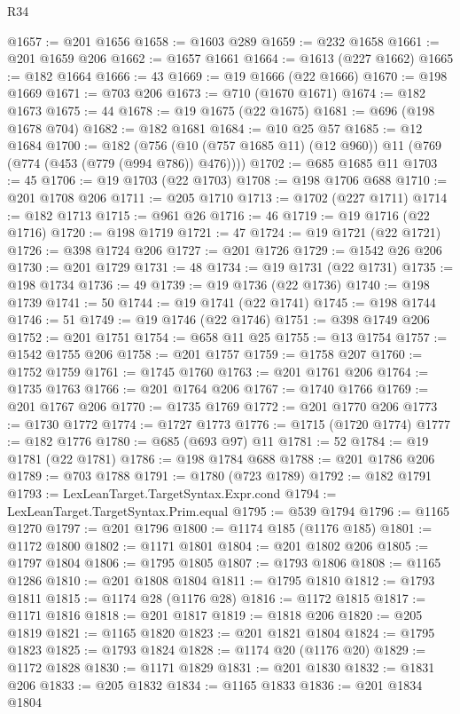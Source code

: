 \begin{lexlean}{R34}
\begin{coremodule}
@1657 := @201 @1656
@1658 := @1603 @289
@1659 := @232 @1658
@1661 := @201 @1659 @206
@1662 := @1657 @1661
@1664 := @1613 (@227 @1662)
@1665 := @182 @1664
@1666 := 43
@1669 := @19 @1666 (@22 @1666)
@1670 := @198 @1669
@1671 := @703 @206
@1673 := @710 (@1670 @1671)
@1674 := @182 @1673
@1675 := 44
@1678 := @19 @1675 (@22 @1675)
@1681 := @696 (@198 @1678 @704)
@1682 := @182 @1681
@1684 := @10 @25 @57
@1685 := @12 @1684
@1700 := @182
    (@756 (@10 (@757 @1685 @11) (@12 @960)) @11 (@769 (@774 (@453 (@779 (@994 @786)) @476))))
@1702 := @685 @1685 @11
@1703 := 45
@1706 := @19 @1703 (@22 @1703)
@1708 := @198 @1706 @688
@1710 := @201 @1708 @206
@1711 := @205 @1710
@1713 := @1702 (@227 @1711)
@1714 := @182 @1713
@1715 := @961 @26
@1716 := 46
@1719 := @19 @1716 (@22 @1716)
@1720 := @198 @1719
@1721 := 47
@1724 := @19 @1721 (@22 @1721)
@1726 := @398 @1724 @206
@1727 := @201 @1726
@1729 := @1542 @26 @206
@1730 := @201 @1729
@1731 := 48
@1734 := @19 @1731 (@22 @1731)
@1735 := @198 @1734
@1736 := 49
@1739 := @19 @1736 (@22 @1736)
@1740 := @198 @1739
@1741 := 50
@1744 := @19 @1741 (@22 @1741)
@1745 := @198 @1744
@1746 := 51
@1749 := @19 @1746 (@22 @1746)
@1751 := @398 @1749 @206
@1752 := @201 @1751
@1754 := @658 @11 @25
@1755 := @13 @1754
@1757 := @1542 @1755 @206
@1758 := @201 @1757
@1759 := @1758 @207
@1760 := @1752 @1759
@1761 := @1745 @1760
@1763 := @201 @1761 @206
@1764 := @1735 @1763
@1766 := @201 @1764 @206
@1767 := @1740 @1766
@1769 := @201 @1767 @206
@1770 := @1735 @1769
@1772 := @201 @1770 @206
@1773 := @1730 @1772
@1774 := @1727 @1773
@1776 := @1715 (@1720 @1774)
@1777 := @182 @1776
@1780 := @685 (@693 @97) @11
@1781 := 52
@1784 := @19 @1781 (@22 @1781)
@1786 := @198 @1784 @688
@1788 := @201 @1786 @206
@1789 := @703 @1788
@1791 := @1780 (@723 @1789)
@1792 := @182 @1791
@1793 := LexLeanTarget.TargetSyntax.Expr.cond
@1794 := LexLeanTarget.TargetSyntax.Prim.equal
@1795 := @539 @1794
@1796 := @1165 @1270
@1797 := @201 @1796
@1800 := @1174 @185 (@1176 @185)
@1801 := @1172 @1800
@1802 := @1171 @1801
@1804 := @201 @1802 @206
@1805 := @1797 @1804
@1806 := @1795 @1805
@1807 := @1793 @1806
@1808 := @1165 @1286
@1810 := @201 @1808 @1804
@1811 := @1795 @1810
@1812 := @1793 @1811
@1815 := @1174 @28 (@1176 @28)
@1816 := @1172 @1815
@1817 := @1171 @1816
@1818 := @201 @1817
@1819 := @1818 @206
@1820 := @205 @1819
@1821 := @1165 @1820
@1823 := @201 @1821 @1804
@1824 := @1795 @1823
@1825 := @1793 @1824
@1828 := @1174 @20 (@1176 @20)
@1829 := @1172 @1828
@1830 := @1171 @1829
@1831 := @201 @1830
@1832 := @1831 @206
@1833 := @205 @1832
@1834 := @1165 @1833
@1836 := @201 @1834 @1804

\end{coremodule}
\end{lexlean}
